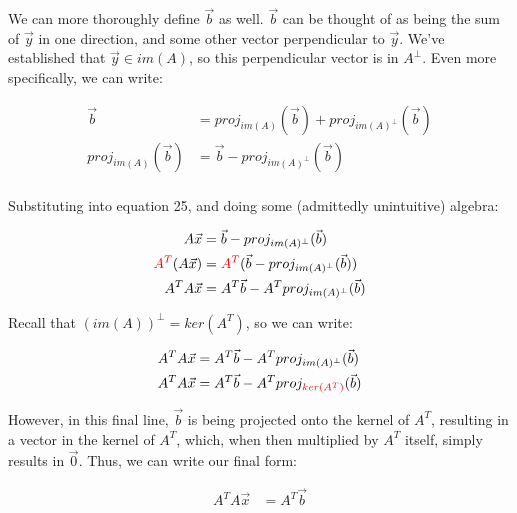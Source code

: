 \documentclass[12pt]{article}
\begin{document}
{We can more thoroughly define $\vec{b}$ as well. $\vec{b}$ can be thought of as being the sum of $\vec{y}$ in one direction, and some other vector perpendicular to $\vec{y}$. We've established that $\vec{y} \in im(A)$, so this perpendicular vector is in $A^\bot$. Even more specifically, we can write:

\begin{equation}
    \begin{split}
       \vec{b} &= proj_{im(A)}(\vec{b}) + proj_{im(A)^\bot}(\vec{b})\\
       proj_{im(A)}(\vec{b}) &= \vec{b} - proj_{im(A)^\bot}(\vec{b})\\
    \end{split}
\end{equation}

Substituting into equation 25, and doing some (admittedly unintuitive) algebra:

\begin{equation}
    \begin{split}
        A\vec{x} &= \vec{b} - proj_{im(A)^\bot}(\vec{b})\\
        \textcolor{red}{A^T}(A\vec{x}) &= \textcolor{red}{A^T}(\vec{b} - proj_{im(A)^\bot}(\vec{b}))\\
        A^T A \vec{x} &= A^{T} \vec{b} - A^{T} proj_{im(A)^\bot}(\vec{b})\\
    \end{split}
\end{equation}

Recall that $(im(A))^\bot = ker(A^T)$, so we can write:

\begin{equation}
    \begin{split}
        A^T A \vec{x} &= A^{T} \vec{b} - A^{T} proj_{im(A)^\bot}(\vec{b})\\
        A^T A \vec{x} &= A^{T} \vec{b} - A^{T} proj_{\textcolor{red}{ker(A^T)}}(\vec{b})
    \end{split}
\end{equation}

However, in this final line, $\vec{b}$ is being projected onto the kernel of $A^T$, resulting in a vector in the kernel of $A^T$, which, when then multiplied by $A^T$ itself, simply results in $\vec{0}$. Thus, we can write our final form:

\begin{equation}
    \begin{split}
        A^T A \vec{x} &= A^{T} \vec{b}\\
    \end{split}
\end{equation}

}
\end{document}
